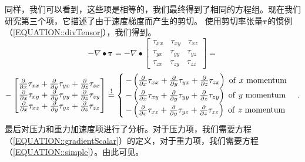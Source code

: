 \documentclass[MathematicsNumericsDerivationsAndOpenFOAM.tex]{subfiles}
\begin{document}
%
%
    同样，我们可以看到，这些项是相等的，我们最终得到了相同的方程组。现在我们研究第三个项，它描述了由于速度梯度而产生的剪切。 使用剪切率张量$\boldsymbol \tau$的惯例（\ref{EQUATION::divTensor}），我们得到。
%
%
\begin{equation*}
  -  \nabla \bullet \boldsymbol \tau
=
  -  \nabla \bullet
  \left[
  \begin{matrix}
  \tau_{xx} ~~~~ \tau_{xy} ~~~~ \tau_{xz} \\
  \tau_{yx} ~~~~ \tau_{yy} ~~~~ \tau_{yz} \\
  \tau_{zx} ~~~~ \tau_{zy} ~~~~ \tau_{zz}
  \end{matrix}
  \right]
=
\end{equation*}
\begin{equation*}
- \left[
  \begin{matrix}
  \frac{\partial}{\partial x}\tau_{xx} + \frac{\partial}{\partial y} \tau_{yx} + \frac{\partial}{\partial z} \tau_{zx} \\
  \frac{\partial}{\partial x}\tau_{xy} + \frac{\partial}{\partial y} \tau_{yy} + \frac{\partial}{\partial z}\tau_{zy} \\
  \frac{\partial}{\partial x}\tau_{xz} + \frac{\partial}{\partial y} \tau_{yz} + \frac{\partial}{\partial z} \tau_{zz}
  \end{matrix}
  \right]
\overset{!}{=}
  \begin{cases}
  -\left(
      \frac{\partial}{\partial x}  \tau_{xx}
      +\frac{\partial}{\partial y}  \tau_{yx}
      +\frac{\partial}{\partial z}  \tau_{zx}
  \right) ~ \mathrm{of~}x ~ \mathrm{momentum} \\
  -\left(
      \frac{\partial}{\partial x}  \tau_{xy}
      +\frac{\partial}{\partial y}  \tau_{yy}
      +\frac{\partial}{\partial z}  \tau_{zy}
  \right) ~ \mathrm{of~}y ~ \mathrm{momentum} \\
    -\left(
      \frac{\partial}{\partial x}  \tau_{xz}
      +\frac{\partial}{\partial y}  \tau_{yz}
      +\frac{\partial}{\partial z}  \tau_{zz}
  \right) ~ \mathrm{of~}z ~ \mathrm{momentum}
  \end{cases}
  .
\end{equation*}
%
%
    最后对压力和重力加速度项进行了分析。对于压力项，我们需要方程（\ref{EQUATION::gradientScalar}）的定义，对于重力项，我们需要方程（\ref{EQUATION::simple}）。由此可见。
%
%
\end{document}
